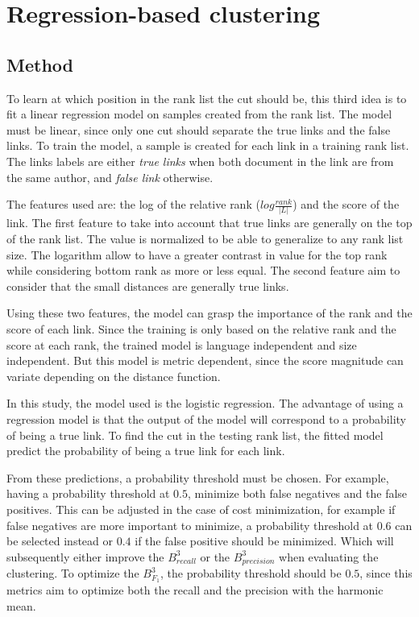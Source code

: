 \section{Regression-based clustering\label{sec:regression_based_clustering}}

\subsection{Method}

To learn at which position in the rank list the cut should be, this third idea is to fit a linear regression model on samples created from the rank list.
The model must be linear, since only one cut should separate the true links and the false links.
To train the model, a sample is created for each link in a training rank list.
The links labels are either \textit{true links} when both document in the link are from the same author, and \textit{false link} otherwise.

The features used are: the log of the relative rank ($log \frac{rank}{|L|}$) and the score of the link.
The first feature to take into account that true links are generally on the top of the rank list.
The value is normalized to be able to generalize to any rank list size.
The logarithm allow to have a greater contrast in value for the top rank while considering bottom rank as more or less equal.
The second feature aim to consider that the small distances are generally true links.

Using these two features, the model can grasp the importance of the rank and the score of each link.
Since the training is only based on the relative rank and the score at each rank, the trained model is language independent and size independent.
But this model is metric dependent, since the score magnitude can variate depending on the distance function.

In this study, the model used is the logistic regression.
The advantage of using a regression model is that the output of the model will correspond to a probability of being a true link.
To find the cut in the testing rank list, the fitted model predict the probability of being a true link for each link.

From these predictions, a probability threshold must be chosen.
For example, having a probability threshold at $0.5$, minimize both false negatives and the false positives.
This can be adjusted in the case of cost minimization, for example if false negatives are more important to minimize, a probability threshold at $0.6$ can be selected instead or $0.4$ if the false positive should be minimized.
Which will subsequently either improve the $B^3_{recall}$ or the $B^3_{precision}$ when evaluating the clustering.
To optimize the $B^3_{F_1}$, the probability threshold should be $0.5$, since this metrics aim to optimize both the recall and the precision with the harmonic mean.

